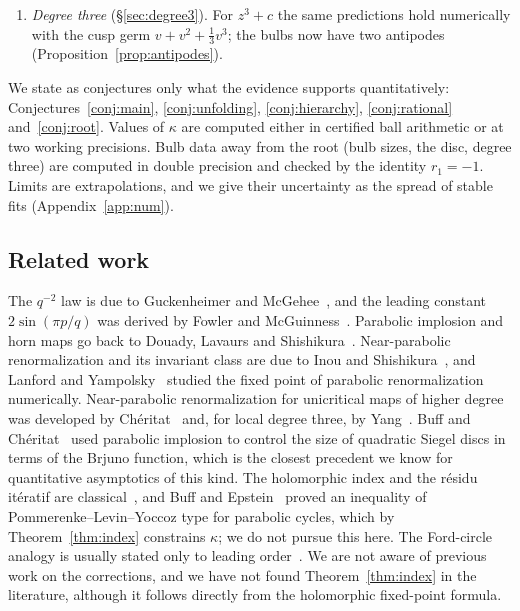 \documentclass[11pt]{amsart}
\theoremstyle{definition}
\theoremstyle{remark}
\begin{document}
\begin{enumerate}
\item \emph{Degree three} (\S\ref{sec:degree3}). For $z^3+c$ the same predictions hold numerically with the cusp germ $v+v^2+\frac13v^3$; the bulbs now have two antipodes (Proposition~\ref{prop:antipodes}).
\end{enumerate}

\begin{table}[t]
\centering\footnotesize

\caption{The constants of this paper. The column ``bulbs'' gives the difference between the horn-map value and the best extrapolated bulb limit; for $\kappa_0^{(3)}$ it gives the error at $q=1024$, which decays like $q^{-2}$. The extrapolation uncertainties are larger: about $3\cdot10^{-25}$ for $\kappa_0$, $2\cdot10^{-7}$ for $\kappa^+_{1/2}$ and $10^{-6}$ for $G_0$.}\label{tab:constants}
\end{table}

We state as conjectures only what the evidence supports quantitatively: Conjectures~\ref{conj:main}, \ref{conj:unfolding}, \ref{conj:hierarchy}, \ref{conj:rational} and~\ref{conj:root}. Values of $\kappa$ are computed either in certified ball arithmetic or at two working precisions. Bulb data away from the root (bulb sizes, the disc, degree three) are computed in double precision and checked by the identity $r_1=-1$. Limits are extrapolations, and we give their uncertainty as the spread of stable fits (Appendix~\ref{app:num}).

\subsection{Related work}
The $q^{-2}$ law is due to Guckenheimer and McGehee~\cite{GM}, and the leading constant $2\sin(\pi p/q)$ was derived by Fowler and McGuinness~\cite{FM}. Parabolic implosion and horn maps go back to Douady, Lavaurs and Shishikura~\cite{Lavaurs,Sh}. Near-parabolic renormalization and its invariant class are due to Inou and Shishikura~\cite{IS}, and Lanford and Yampolsky~\cite{LY} studied the fixed point of parabolic renormalization numerically. Near-parabolic renormalization for unicritical maps of higher degree was developed by Ch\'eritat~\cite{Cheritat} and, for local degree three, by Yang~\cite{Yang}. Buff and Ch\'eritat~\cite{BuffCheritat} used parabolic implosion to control the size of quadratic Siegel discs in terms of the Brjuno function, which is the closest precedent we know for quantitative asymptotics of this kind. The holomorphic index and the r\'esidu it\'eratif are classical~\cite{Milnor,Ecalle}, and Buff and Epstein~\cite{BE} proved an inequality of Pommerenke--Levin--Yoccoz type for parabolic cycles, which by Theorem~\ref{thm:index} constrains $\kappa$; we do not pursue this here. The Ford-circle analogy is usually stated only to leading order~\cite{Devaney}. We are not aware of previous work on the corrections, and we have not found Theorem~\ref{thm:index} in the literature, although it follows directly from the holomorphic fixed-point formula.
\end{document}
